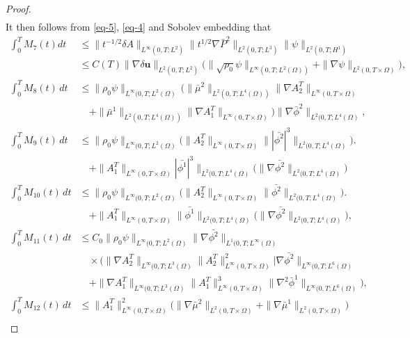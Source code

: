 \documentclass[11pt]{article}
\numberwithin{equation}{section}
\begin{document}
\begin{proof}
\begin{align*}
\end{align*}
It then follows from \eqref{eq-5}, \eqref{eq-4} and Sobolev embedding that
\begin{align*}
\int_0^T M_7(t) dt &\leq \| t^{-1/2} \delta A \|_{L^\infty(0,T; L^2)} \| t^{1/2} \nabla \bar{P}^2 \|_{L^2(0,T; L^3)} \| \psi \|_{L^2(0,T; H^1)} \\
&\leq C(T) \| \nabla \delta \mathbf{u}\|_{L^2(0,T; L^2)} \big( \| \sqrt{\rho_0} \psi \|_{L^\infty(0,T; L^2(\Omega))} + \| \nabla \psi \|_{L^2(0,T \times \Omega)} \big),\\
\int_{0}^{T} M_8(t) \, dt &\leq \|\rho_0 \psi\|_{L^\infty(0,T; L^2(\Omega)} \, (\|\bar{\mu}^2\|_{L^2(0,T; L^4(\Omega))} \|\nabla A_2^T\|_{L^\infty(0,T\times \Omega)}
\\ &\quad+ \|\bar{\mu}^1\|_{L^2(0,T; L^4(\Omega))} \|\nabla A_1^T\|_{L^\infty(0,T\times \Omega)})\|\nabla\bar{\phi}^2\|_{L^2(0,T; L^4(\Omega)},\\
\int_0^T M_9(t) \, dt &\leq \| \rho_0 \psi \|_{L^\infty(0,T;L^2(\Omega)} \big( \| A_2^T \|_{L^\infty(0,T\times\Omega)} \| |\bar{\phi^2}|^3 \|_{L^2(0,T;L^4(\Omega)} \big). \\
&\quad+ \| A_1^T \|_{L^\infty(0,T\times\Omega)} |\bar{\phi^1}|^3 \|_{L^2(0,T;L^4(\Omega)} \big( \| \nabla \bar{\phi^2}\|_{L^2(0,T;L^4(\Omega)} \big) \\
\int_0^T M_{10}(t) \, dt &\leq \|\rho_0 \psi \|_{L^\infty(0,T;L^2(\Omega)} \big( \| A_2^T \|_{L^\infty(0,T\times\Omega)} \| \bar{\phi^2} \|_{L^2(0,T;L^4(\Omega)} \big).\\
&\quad+ \| A_1^T \|_{L^\infty(0,T\times\Omega)} \|\bar{\phi^1} \|_{L^2(0,T;L^4(\Omega)} \big( \| \nabla \bar{\phi^2} \|_{L^2(0,T;L^4(\Omega)} \big), \\
\int_0^T M_{11}(t) \, dt &\leq C_0 \| \rho_0 \psi \|_{L^\infty(0,T;L^2(\Omega)}\| \nabla \bar{\phi^2} \|_{L^1(0,T;L^\infty(\Omega)} \\
 &\quad \times\big( \| \nabla A_2^T \|_{L^\infty(0,T;L^3(\Omega)} \| A_2^T \|_{L^\infty(0,T\times\Omega)}^2 | \nabla \bar{\phi^2} \|_{L^\infty(0,T;L^6(\Omega)}
 \\&\quad + \| \nabla A_1^T \|_{L^\infty(0,T;L^3(\Omega)}\| A_1^T \|_{L^\infty(0,T\times\Omega)}^3 \| \nabla^2 \bar{\phi}^1 \|_{L^\infty(0,T;L^6(\Omega)} \big),\\
\int_{0}^{T} M_{12}(t) \, dt &\leq \| A_{1}^T \|_{L^{\infty}(0,T \times \Omega)}^2 \big( \| \nabla \bar{\mu}^2 \|_{L^2(0,T \times \Omega)} + \| \nabla \bar{\mu}^1 \|_{L^2(0,T \times \Omega)} \big) \\

\end{align*}
\end{proof}
\end{document}
